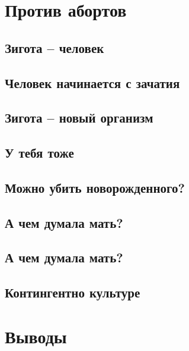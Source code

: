 \documentclass[a4paper,12pt]{report}
\begin{document}
\chapter{Против абортов}
\section{Зигота -- человек}
\section{Человек начинается с зачатия}
\section{Зигота -- новый организм}
\section{У тебя тоже}
\section{Можно убить новорожденного?}
\section{А чем думала мать?}
\section{А чем думала мать?}
\section{Контингентно культуре}
\section{}
\section{}
\section{}

\chapter{Выводы}
\end{document}
